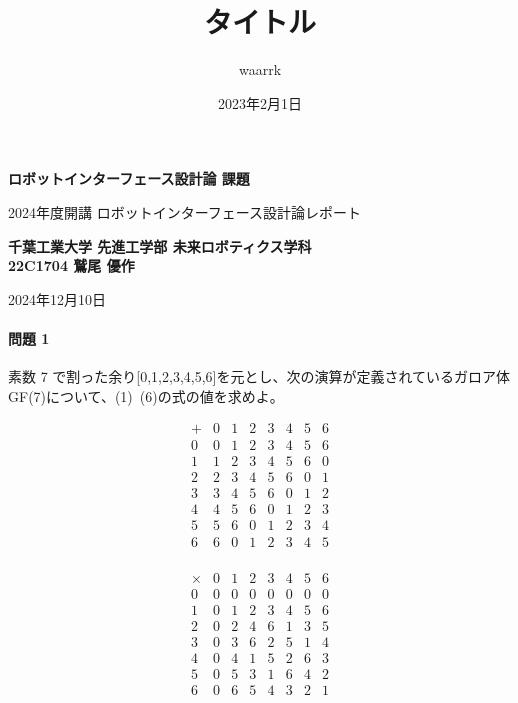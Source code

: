 \documentclass[dvipdfmx,titlepage,a4j]{jsarticle}
\title{タイトル}
\author{waarrk}
\date{2023年2月1日}
\begin{document}
\begin{titlepage}
    \centering
    \vspace*{2cm}

    \vspace{1cm}

    {\LARGE \textbf{ロボットインターフェース設計論 課題}}

    \vspace{0.5cm}

    {2024年度開講 ロボットインターフェース設計論レポート}

    \vspace{1.5cm}

    {\textbf{千葉工業大学 先進工学部 未来ロボティクス学科}\\}
    {\textbf{22C1704 鷲尾 優作}}

    \vfill

    {\large 2024年12月10日}

    \vspace{1cm}
\end{titlepage}

\paragraph{ 問題 1\\}
素数 7 で割った余り[0,1,2,3,4,5,6]を元とし、次の演算が定義されているガロア体 GF(7)について、(1)~(6)の式の値を求めよ。

\begin{minipage}{0.45\hsize} \centering
\[
\begin{array}{c|ccccccc}
+ & 0 & 1 & 2 & 3 & 4 & 5 & 6 \\ \hline
0 & 0 & 1 & 2 & 3 & 4 & 5 & 6 \\
1 & 1 & 2 & 3 & 4 & 5 & 6 & 0 \\
2 & 2 & 3 & 4 & 5 & 6 & 0 & 1 \\
3 & 3 & 4 & 5 & 6 & 0 & 1 & 2 \\
4 & 4 & 5 & 6 & 0 & 1 & 2 & 3 \\
5 & 5 & 6 & 0 & 1 & 2 & 3 & 4 \\
6 & 6 & 0 & 1 & 2 & 3 & 4 & 5 \\
\end{array}
\]
\end{minipage} \begin{minipage}{0.45\hsize} \centering
\[
\begin{array}{c|ccccccc}
\times & 0 & 1 & 2 & 3 & 4 & 5 & 6 \\ \hline
0 & 0 & 0 & 0 & 0 & 0 & 0 & 0 \\
1 & 0 & 1 & 2 & 3 & 4 & 5 & 6 \\
2 & 0 & 2 & 4 & 6 & 1 & 3 & 5 \\
3 & 0 & 3 & 6 & 2 & 5 & 1 & 4 \\
4 & 0 & 4 & 1 & 5 & 2 & 6 & 3 \\
5 & 0 & 5 & 3 & 1 & 6 & 4 & 2 \\
6 & 0 & 6 & 5 & 4 & 3 & 2 & 1 \\
\end{array}
\]
\end{minipage}
\\
\end{document}
